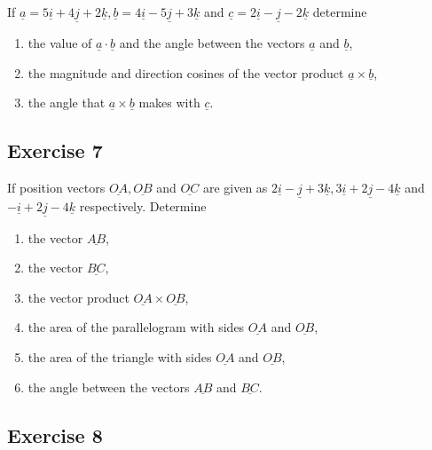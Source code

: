 \documentclass[
  11pt,
  oneside]{book}
\providecommand{\tightlist}{%
  \setlength{\itemsep}{0pt}\setlength{\parskip}{0pt}}
\newcommand{\slide}{}
\theoremstyle{definition}
\theoremstyle{definition}
\theoremstyle{definition}
\theoremstyle{definition}
\theoremstyle{remark}
\begin{document}
If \(\underline{a} = 5\underline{i} + 4\underline{j} + 2\underline{k}, \underline{b} = 4\underline{i} - 5\underline{j} + 3\underline{k}\) and \(\underline{c} = 2\underline{i} - \underline{j} - 2\underline{k}\) determine

\begin{enumerate}
\def\labelenumi{\roman{enumi}.}
\tightlist
\item
  the value of \(\underline{a} \cdot \underline{b}\) and the angle between the vectors \(\underline{a}\) and \(\underline{b}\),
\item
  the magnitude and direction cosines of the vector product \(\underline{a} \times \underline{b}\),
\item
  the angle that \(\underline{a} \times \underline{b}\) makes with \(\underline{c}\).
\end{enumerate}

\slide

\subsection*{Exercise 7}\label{exercise-7-3}

If position vectors \(\underline{OA}, \underline{OB}\) and \(\underline{OC}\) are given as \(2\underline{i} - \underline{j} + 3\underline{k}, 3\underline{i} + 2\underline{j} - 4\underline{k}\) and \(-\underline{i} + 2\underline{j} - 4\underline{k}\) respectively. Determine

\begin{enumerate}
\def\labelenumi{\roman{enumi}.}
\tightlist
\item
  the vector \(\underline{AB}\),
\item
  the vector \(\underline{BC}\),
\item
  the vector product \(\underline{OA} \times \underline{OB}\),
\item
  the area of the parallelogram with sides \(\underline{OA}\) and \(\underline{OB}\),
\item
  the area of the triangle with sides \(\underline{OA}\) and \(\underline{OB}\),
\item
  the angle between the vectors \(\underline{AB}\) and \(\underline{BC}\).
\end{enumerate}

\slide

\subsection*{Exercise 8}\label{exercise-8-2}
\end{document}
